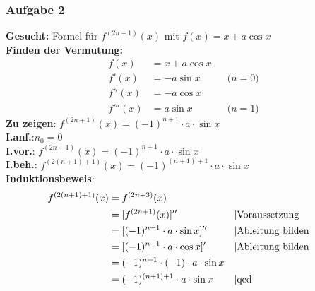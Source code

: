 \subsubsection{Aufgabe 2}
\textbf{Gesucht:} Formel für $ f^{(2n+1)}(x) $ mit $ f(x)=x+a\cos x $ \\
\textbf{Finden der Vermutung:}\begin{align*} 	
f(x) &= x+a\cos x \\
f'(x) &= -a \sin x &&\text{($n=0$)}\\
f''(x) &= -a\cos x \\
f'''(x) &= a \sin x&&\text{($n=1$)}\end{align*}
\textbf{Zu zeigen}: $ f^{(2n+1)}(x) = (-1)^{n+1} \cdot a \cdot \sin x $\\
\textbf{I.anf.}:$ n_0 = 0 $\\
\textbf{I.vor.}: $ f^{(2n+1)}(x) = (-1)^{n+1} \cdot a \cdot \sin x $\\
\textbf{I.beh.}: $ f^{(2(n+1)+1)}(x) = (-1)^{(n+1)+1} \cdot a \cdot \sin x $\\
\textbf{Induktionsbeweis}:\begin{align*}
f^{(2(n+1)+1)}(x) &= f^{(2n+3)}(x) \\
									&= [f^{(2n+1)}(x)]'' 						&& \text{\textbar Voraussetzung}\\
									&= [(-1)^{n+1} \cdot a \cdot \sin x]''&& \text{\textbar Ableitung bilden}\\
									&= [(-1)^{n+1} \cdot a \cdot \cos x]' && \text{\textbar Ableitung bilden}\\
									&= (-1)^{n+1}\cdot(-1) \cdot a \cdot \sin x \\
									&= (-1)^{(n+1)+1} \cdot a \cdot \sin x && \text{\textbar qed}\end{align*}

